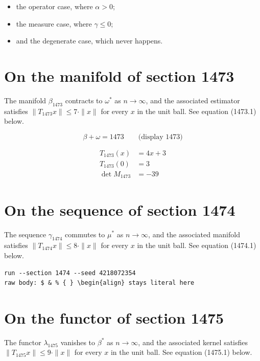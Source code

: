 \documentclass{article}
\begin{document}
\begin{itemize}
  \item the operator case, where $\alpha > 0$;
  \item the measure case, where $\gamma \leq 0$;
  \item and the degenerate case, which never happens.
\end{itemize}

\section{On the manifold of section 1473}
The manifold $\beta_{1473}$ contracts to $\omega^{*}$ as $n \to \infty$,
and the associated estimator satisfies $\|T_{1473} x\| \leq 7 \cdot \|x\|$
for every $x$ in the unit ball. See equation (1473.1) below.

$$
\beta + \omega = 1473 \qquad \text{(display 1473)}
$$

\begin{align}
T_{1473}(x) &= 4 x + 3 \\
T_{1473}(0) &= 3 \\
\det M_{1473} &= -39
\end{align}

\section{On the sequence of section 1474}
The sequence $\gamma_{1474}$ commutes to $\mu^{*}$ as $n \to \infty$,
and the associated manifold satisfies $\|T_{1474} x\| \leq 8 \cdot \|x\|$
for every $x$ in the unit ball. See equation (1474.1) below.

\begin{verbatim}
run --section 1474 --seed 4218072354
raw body: $ & % { } \begin{align} stays literal here
\end{verbatim}

\section{On the functor of section 1475}
The functor $\lambda_{1475}$ vanishes to $\beta^{*}$ as $n \to \infty$,
and the associated kernel satisfies $\|T_{1475} x\| \leq 9 \cdot \|x\|$
for every $x$ in the unit ball. See equation (1475.1) below.
\end{document}
